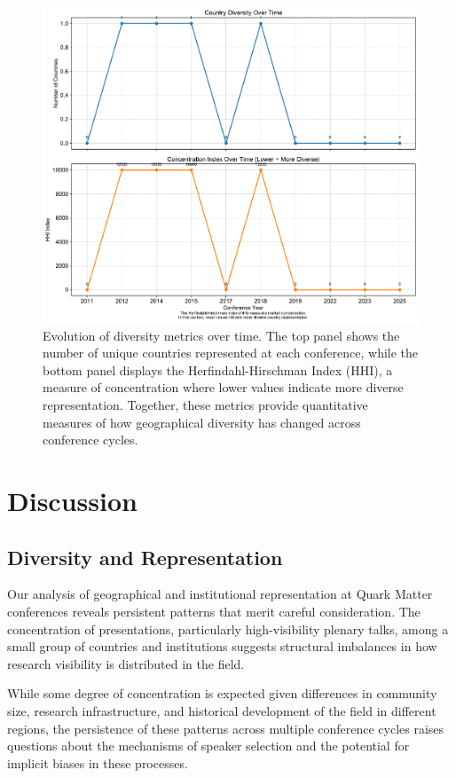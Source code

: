 \documentclass[a4paper,11pt]{article}
\begin{document}
\begin{figure}[H]
\centering
\includegraphics[width=\textwidth]{figures/diversity_metrics.pdf}
\caption{Evolution of diversity metrics over time. The top panel shows the number of unique countries represented at each conference, while the bottom panel displays the Herfindahl-Hirschman Index (HHI), a measure of concentration where lower values indicate more diverse representation. Together, these metrics provide quantitative measures of how geographical diversity has changed across conference cycles.}
\label{fig:diversity_metrics}
\end{figure}

\section{Discussion}

\subsection{Diversity and Representation}

Our analysis of geographical and institutional representation at Quark Matter conferences reveals persistent patterns that merit careful consideration. The concentration of presentations, particularly high-visibility plenary talks, among a small group of countries and institutions suggests structural imbalances in how research visibility is distributed in the field.

While some degree of concentration is expected given differences in community size, research infrastructure, and historical development of the field in different regions, the persistence of these patterns across multiple conference cycles raises questions about the mechanisms of speaker selection and the potential for implicit biases in these processes.
\end{document}
